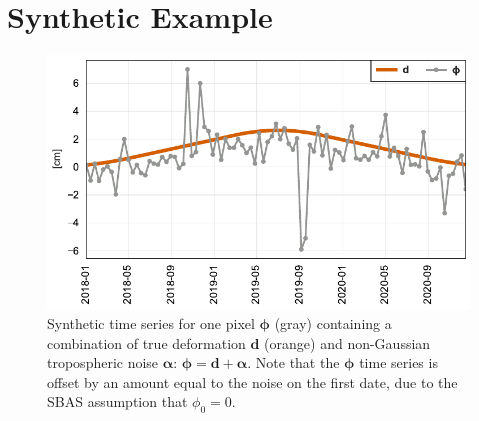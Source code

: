 %


\section{Synthetic Example}

\begin{figure}[!h]
	\centering
	\includegraphics[width=.99\textwidth]{figures/chapter5-lowess/figure2-demo-data-ts-only.pdf}
	\caption[Synthetic data for LOWESS smoothing]{
		Synthetic time series for one pixel $ \bm{\phi} $ (gray) containing a combination of true deformation $\bm{d}$ (orange) and non-Gaussian tropospheric noise $ \bm{\alpha} $: $\bm{\phi} =\bm{d} + \bm{\alpha}$. 
		Note that the $ \bm{\phi} $ time series is offset by an amount equal to the noise on the first date, due to the SBAS assumption that $ \phi_0 = 0 $.
	}
	\label{fig:ch5-demo-data}
\end{figure}


